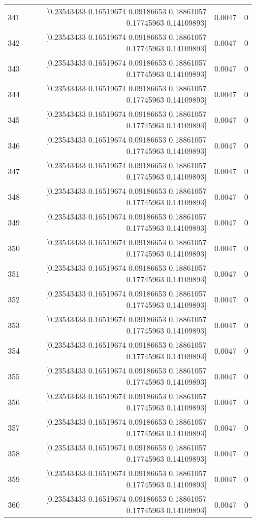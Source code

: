 \begin{longtable}{lrrr}
341 & [0.23543433 0.16519674 0.09186653 0.18861057 0.17745963 0.14109893] & 0.0047 & 0 \\
342 & [0.23543433 0.16519674 0.09186653 0.18861057 0.17745963 0.14109893] & 0.0047 & 0 \\
343 & [0.23543433 0.16519674 0.09186653 0.18861057 0.17745963 0.14109893] & 0.0047 & 0 \\
344 & [0.23543433 0.16519674 0.09186653 0.18861057 0.17745963 0.14109893] & 0.0047 & 0 \\
345 & [0.23543433 0.16519674 0.09186653 0.18861057 0.17745963 0.14109893] & 0.0047 & 0 \\
346 & [0.23543433 0.16519674 0.09186653 0.18861057 0.17745963 0.14109893] & 0.0047 & 0 \\
347 & [0.23543433 0.16519674 0.09186653 0.18861057 0.17745963 0.14109893] & 0.0047 & 0 \\
348 & [0.23543433 0.16519674 0.09186653 0.18861057 0.17745963 0.14109893] & 0.0047 & 0 \\
349 & [0.23543433 0.16519674 0.09186653 0.18861057 0.17745963 0.14109893] & 0.0047 & 0 \\
350 & [0.23543433 0.16519674 0.09186653 0.18861057 0.17745963 0.14109893] & 0.0047 & 0 \\
351 & [0.23543433 0.16519674 0.09186653 0.18861057 0.17745963 0.14109893] & 0.0047 & 0 \\
352 & [0.23543433 0.16519674 0.09186653 0.18861057 0.17745963 0.14109893] & 0.0047 & 0 \\
353 & [0.23543433 0.16519674 0.09186653 0.18861057 0.17745963 0.14109893] & 0.0047 & 0 \\
354 & [0.23543433 0.16519674 0.09186653 0.18861057 0.17745963 0.14109893] & 0.0047 & 0 \\
355 & [0.23543433 0.16519674 0.09186653 0.18861057 0.17745963 0.14109893] & 0.0047 & 0 \\
356 & [0.23543433 0.16519674 0.09186653 0.18861057 0.17745963 0.14109893] & 0.0047 & 0 \\
357 & [0.23543433 0.16519674 0.09186653 0.18861057 0.17745963 0.14109893] & 0.0047 & 0 \\
358 & [0.23543433 0.16519674 0.09186653 0.18861057 0.17745963 0.14109893] & 0.0047 & 0 \\
359 & [0.23543433 0.16519674 0.09186653 0.18861057 0.17745963 0.14109893] & 0.0047 & 0 \\
360 & [0.23543433 0.16519674 0.09186653 0.18861057 0.17745963 0.14109893] & 0.0047 & 0 \\

\end{longtable}
